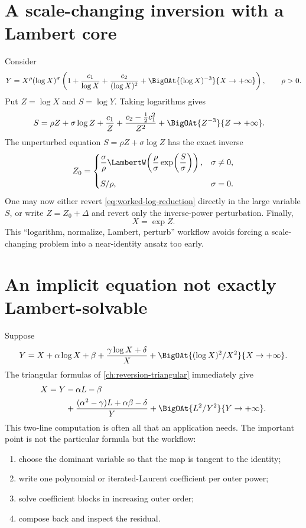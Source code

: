 \documentclass[11pt,oneside]{book}
\theoremstyle{definition}
\theoremstyle{remark}
\begin{document}
\section{A scale-changing inversion with a Lambert core}
Consider
\begin{equation}\label{eq:worked-scale-change}
 Y=X^\rho(\log X)^\sigma
 \left(1+\frac{c_1}{\log X}
       +\frac{c_2}{(\log X)^2}
       +\BigOAt{(\log X)^{-3}}{X\to+\infty}\right),
 \qquad \rho>0.
\end{equation}
Put $Z=\log X$ and $S=\log Y$. Taking logarithms gives
\begin{align}
 S
 &=\rho Z+\sigma\log Z
   +\frac{c_1}{Z}
   +\frac{c_2-\frac12c_1^2}{Z^2}
   +\BigOAt{Z^{-3}}{Z\to+\infty}.
 \label{eq:worked-log-reduction}
\end{align}
The unperturbed equation $S=\rho Z+\sigma\log Z$ has the exact inverse
\[
 Z_0=
 \begin{cases}
 \displaystyle
 \frac{\sigma}{\rho}
 \LambertW\!\left(\frac{\rho}{\sigma}
          \exp\!\left(\frac S\sigma\right)\right),
 &\sigma\ne0,\\[1.2em]
 S/\rho,&\sigma=0.
 \end{cases}
\]
One may now either revert \eqref{eq:worked-log-reduction} directly in the
large variable $S$, or write $Z=Z_0+\Delta$ and revert only the inverse-power
perturbation. Finally,
\[
 X=\exp Z.
\]
This ``logarithm, normalize, Lambert, perturb'' workflow avoids forcing a
scale-changing problem into a near-identity ansatz too early.

\section{An implicit equation not exactly Lambert-solvable}
Suppose
\begin{equation}\label{eq:worked-implicit}
 Y=X+\alpha\log X+\beta
 +\frac{\gamma\log X+\delta}{X}
 +\BigOAt{(\log X)^2/X^2}{X\to+\infty}.
\end{equation}
The triangular formulas of \cref{ch:reversion-triangular} immediately give
\begin{align}
 X=Y&-\alpha L-\beta\\
 &+\frac{(\alpha^2-\gamma)L+\alpha\beta-\delta}{Y}
 +\BigOAt{L^2/Y^2}{Y\to+\infty}.
 \label{eq:worked-implicit-inverse}
\end{align}
This two-line computation is often all that an application needs. The
important point is not the particular formula but the workflow:
\begin{enumerate}
\item choose the dominant variable so that the map is tangent to the
      identity;
\item write one polynomial or iterated-Laurent coefficient per outer power;
\item solve coefficient blocks in increasing outer order;
\item compose back and inspect the residual.
\end{enumerate}
\end{document}

